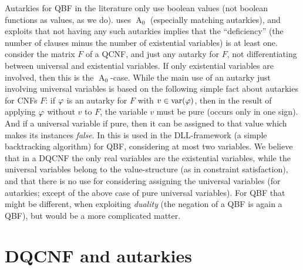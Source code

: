 \documentclass[conference]{IEEEtran}
\DeclareMathOperator{\Aaut}{A}
\begin{document}
Autarkies for QBF in the literature only use boolean values (not boolean functions as values, as we do).
\cite{BueningZhao2008QBFFixDef} uses $\Aaut_0$ (especially matching autarkies), and exploits that not having any such autarkies implies that the ``deficiency'' (the number of clauses minus the number of existential variables) is at least one.
\cite{Ruehmkorf2010Autarky} consider the matrix $F$ of a QCNF, and just any autarky for $F$, not differentiating between universal and existential variables.
If only existential variables are involved, then this is the $\Aaut_0$-case.
While the main use of an autarky just involving universal variables is based on the following simple fact about autarkies for CNFs $F$: if $\varphi$ is an autarky for $F$ with $v \in \operatorname{var}(\varphi)$, then in the result of applying $\varphi$ without $v$ to $F$, the variable $v$ must be pure (occurs only in one sign).
And if a universal variable if pure, then it can be assigned to that value which makes its instances \emph{false}.
In \cite{Ruehmkorf2010Autarky} this is used in the DLL-framework (a simple backtracking algorithm) for QBF, considering at most two variables.
We believe that in a DQCNF the only real variables are the existential variables, while the universal variables belong to the value-structure (as in constraint satisfaction), and that there is no use for considering assigning the universal variables (for autarkies; except of the above case of pure universal variables).
For QBF that might be different, when exploiting \emph{duality} (the negation of a QBF is again a QBF), but would be a more complicated matter.




\section{DQCNF and autarkies}
\label{sec:dqcnfaut}
\end{document}
